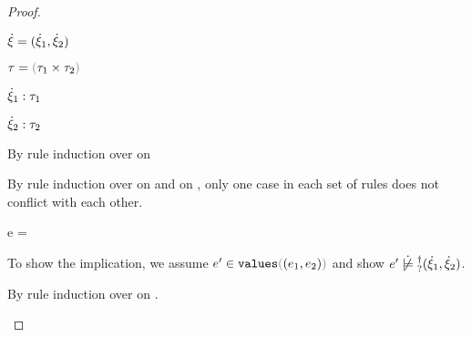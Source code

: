 \begin{proof}
\begin{byCases}
\begin{byCases}
\begin{byCases}
\begin{byCases}
          \end{byCases}
        \end{byCases}
      \end{byCases}
    \item[\text{(\ref{rule:CTPair})}]
    \begin{pfsteps*}
    \item $\dot{\xi}=(\dot{\xi}_1 , \dot{\xi}_2)$ 
    \item $\tau=\tprod{\tau_1}{\tau_2}$ 
    \item $\dot{\xi}_1 : \tau_1$  
    \item $\dot{\xi}_2 : \tau_2$  
    \end{pfsteps*} 

    By rule induction over  on 
    \begin{byCases}
    \item[\text{(\ref{rule:FVal})}]
      \begin{pfsteps}
      \item {}  
      \end{pfsteps}
      By rule induction over  on  and
       on , only one case in each set
      of rules does not conflict with each other.
      \begin{byCases}
      \item[\text{(\ref{rule:VPair}) and (\ref{rule:TPair})}]
        \begin{pfsteps}
        \item e =  
        \item {}  
        \item {}  
        \item {}  
        \item {}  
        \item {}  
        \item {}  
        \end{pfsteps}
        To show the implication, we assume $\inValues{e'}{\hpair{e_1}{e_2}}$ and show $\cnotsatisfyormay{e'}{\cpair{\hxi_1}{\hxi_2}}$.
        \begin{pfsteps}
        \item {}  
        \end{pfsteps}
        By rule induction over  on .
        \begin{byCases}


\end{byCases}
\end{byCases}
\end{byCases}
\end{byCases}
\end{proof}
